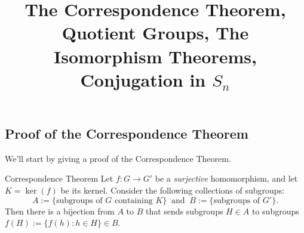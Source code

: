 \title{The Correspondence Theorem, Quotient Groups, The Isomorphism Theorems, Conjugation in $S_n$}



\subsection{Proof of the Correspondence Theorem}

We'll start by giving a proof of the Correspondence Theorem.

\begin{theorem}{Correspondence Theorem}
    Let $f: G \to G'$ be a \emph{surjective} homomorphism, and let $K = \ker(f)$ be its kernel.  Consider the following collections of subgroups:
    \[ A := \{\text{subgroups of } G \text{ containing } K\} ~ \text{ and } ~ B := \{\text{subgroups of } G'\}. \]
    Then there is a bijection from $A$ to $B$ that sends subgroups $H \in A$ to subgroups $f(H) := \{f(h): h \in H\} \in B$.
\end{theorem}

